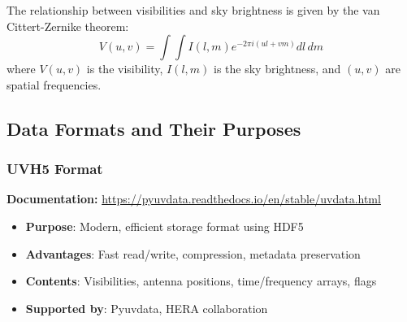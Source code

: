 \documentclass[11pt]{article}
\begin{document}
The relationship between visibilities and sky brightness is given by the van Cittert-Zernike theorem:
\begin{equation}
V(u,v) = \int \int I(l,m) e^{-2\pi i(ul + vm)} dl \, dm
\end{equation}
where $V(u,v)$ is the visibility, $I(l,m)$ is the sky brightness, and $(u,v)$ are spatial frequencies.

\subsection{Data Formats and Their Purposes}

\subsubsection{UVH5 Format}
\textbf{Documentation:} \url{https://pyuvdata.readthedocs.io/en/stable/uvdata.html}

\begin{itemize}
    \item \textbf{Purpose}: Modern, efficient storage format using HDF5
    \item \textbf{Advantages}: Fast read/write, compression, metadata preservation
    \item \textbf{Contents}: Visibilities, antenna positions, time/frequency arrays, flags
    \item \textbf{Supported by}: Pyuvdata, HERA collaboration
\end{itemize}
\end{document}
